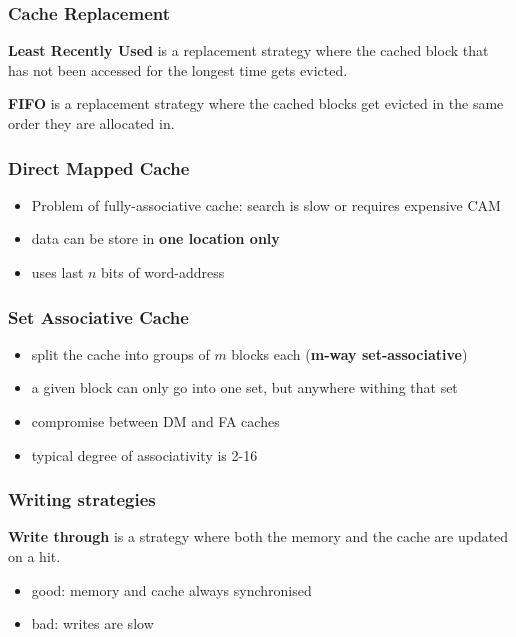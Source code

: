 \documentclass{article}
\begin{document}
\subsubsection{Cache Replacement}

\begin{definition}
	\textbf{Least Recently Used} is a replacement strategy where the cached block that has not been accessed
	for the longest time gets evicted.
\end{definition}
\begin{definition}
	\textbf{FIFO} is a replacement strategy where the cached blocks get evicted in the same order they are 
	allocated in.
\end{definition}

\subsubsection{Direct Mapped Cache}

\begin{itemize}
	\item Problem of fully-associative cache: search is slow or requires expensive CAM
	\item data can be store in \textbf{one location only}
	\item uses last $n$ bits of word-address
\end{itemize}

\subsubsection{Set Associative Cache}

\begin{itemize}
	\item split the cache into groups of $m$ blocks each (\textbf{m-way set-associative})
	\item a given block can only go into one set, but anywhere withing that set 
	\item compromise between DM and FA caches
	\item typical degree of associativity is 2-16
\end{itemize}

\subsubsection{Writing strategies}

\begin{definition}
	\textbf{Write through} is a strategy where both the memory and the cache
	are updated on a hit.
	\begin{itemize}
		\item good: memory and cache always synchronised
		\item bad: writes are slow
	\end{itemize}
\end{definition}
\end{document}
